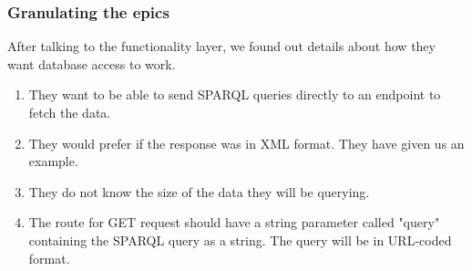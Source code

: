 
\subsubsection*{Granulating the epics}
After talking to the functionality layer, we found out details about how they want database access to work. 
\begin{enumerate}
    \item They want to be able to send SPARQL queries directly to an endpoint to fetch the data.
    \item They would prefer if the response was in XML format. They have given us an example.
    \item They do not know the size of the data they will be querying.
    \item The route for GET request should have a string parameter called "query" containing the SPARQL query as a string.
    The query will be in URL-coded format.
\end{enumerate}